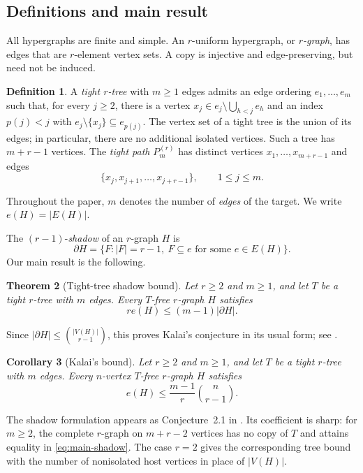 \documentclass[11pt]{article}
\numberwithin{equation}{section}
\newtheorem{theorem}{Theorem}[section]
\newtheorem{corollary}[theorem]{Corollary}
\theoremstyle{definition}
\newtheorem{definition}[theorem]{Definition}
\begin{document}
\subsection{Definitions and main result}

All hypergraphs are finite and simple.  An $r$-uniform hypergraph, or
\emph{$r$-graph}, has edges that are $r$-element vertex sets.  A copy is
injective and edge-preserving, but need not be induced.

\begin{definition}
A \emph{tight $r$-tree} with $m\geq1$ edges admits an edge ordering
$e_1,\ldots,e_m$ such that, for every $j\geq2$, there is a vertex
$x_j\in e_j\setminus\bigcup_{h<j}e_h$ and an index $p(j)<j$ with
$e_j\setminus\{x_j\}\subseteq e_{p(j)}$.
The vertex set of a tight tree is the union of its edges; in particular,
there are no additional isolated vertices.  Such a tree has $m+r-1$
vertices.
The \emph{tight path} $P_m^{(r)}$ has distinct vertices
$x_1,\ldots,x_{m+r-1}$ and edges
\[
 \{x_j,x_{j+1},\ldots,x_{j+r-1}\},\qquad 1\leq j\leq m.
\]
\end{definition}

Throughout the paper, $m$ denotes the number of \emph{edges} of the
target.  We write $e(H)=|E(H)|$.

The $(r-1)$-\emph{shadow} of an $r$-graph $H$ is
\[
 \partial H=\{F: |F|=r-1,\ F\subseteq e\text{ for some }e\in E(H)\}.
\]
Our main result is the following.

\begin{theorem}[Tight-tree shadow bound]
\label{thm:main}
Let $r\geq2$ and $m\geq1$, and let $T$ be a tight $r$-tree with
$m$ edges.  Every $T$-free $r$-graph $H$ satisfies
\begin{equation}
 r e(H)\leq(m-1)|\partial H|.
 \label{eq:main-shadow}
\end{equation}
\end{theorem}

Since $|\partial H|\leq\binom{|V(H)|}{r-1}$, this proves Kalai's
conjecture in its usual form; see \cite{FJKMV2019,Stein2024}.

\begin{corollary}[Kalai's bound]
\label{cor:kalai}
Let $r\geq2$ and $m\geq1$, and let $T$ be a tight $r$-tree with
$m$ edges.  Every $n$-vertex $T$-free $r$-graph $H$ satisfies
\[
 e(H)\leq\frac{m-1}{r}\binom{n}{r-1}.
\]
\end{corollary}

The shadow formulation appears as Conjecture~2.1 in
\cite{FJKMV2019}.  Its coefficient is sharp: for $m\geq2$, the complete
$r$-graph on $m+r-2$ vertices has no copy of $T$ and attains equality
in \eqref{eq:main-shadow}.  The case $r=2$ gives the corresponding
tree bound with the number of nonisolated host vertices in place of
$|V(H)|$.
\end{document}

